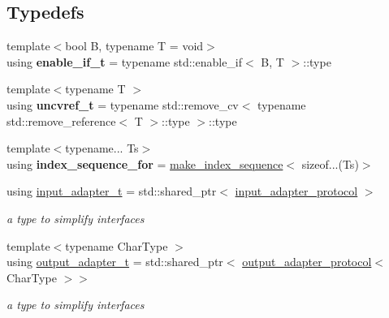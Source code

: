 \subsection*{Typedefs}
\begin{DoxyCompactItemize}
\item 
{\footnotesize template$<$bool B, typename T  = void$>$ }\\using {\bfseries enable\+\_\+if\+\_\+t} = typename std\+::enable\+\_\+if$<$ B, T $>$\+::type\hypertarget{namespacenlohmann_1_1detail_a02bcbc878bee413f25b985ada771aa9c}{}\label{namespacenlohmann_1_1detail_a02bcbc878bee413f25b985ada771aa9c}

\item 
{\footnotesize template$<$typename T $>$ }\\using {\bfseries uncvref\+\_\+t} = typename std\+::remove\+\_\+cv$<$ typename std\+::remove\+\_\+reference$<$ T $>$\+::type $>$\+::type\hypertarget{namespacenlohmann_1_1detail_a53a082eedad9f4729fcd8fed552a21f7}{}\label{namespacenlohmann_1_1detail_a53a082eedad9f4729fcd8fed552a21f7}

\item 
{\footnotesize template$<$typename... Ts$>$ }\\using {\bfseries index\+\_\+sequence\+\_\+for} = \hyperlink{structnlohmann_1_1detail_1_1make__index__sequence}{make\+\_\+index\+\_\+sequence}$<$ sizeof...(Ts)$>$\hypertarget{namespacenlohmann_1_1detail_a24800493c6ec02ce033dcbb47b7fd28e}{}\label{namespacenlohmann_1_1detail_a24800493c6ec02ce033dcbb47b7fd28e}

\item 
using \hyperlink{namespacenlohmann_1_1detail_ae132f8cd5bb24c5e9b40ad0eafedf1c2}{input\+\_\+adapter\+\_\+t} = std\+::shared\+\_\+ptr$<$ \hyperlink{structnlohmann_1_1detail_1_1input__adapter__protocol}{input\+\_\+adapter\+\_\+protocol} $>$\hypertarget{namespacenlohmann_1_1detail_ae132f8cd5bb24c5e9b40ad0eafedf1c2}{}\label{namespacenlohmann_1_1detail_ae132f8cd5bb24c5e9b40ad0eafedf1c2}

\begin{DoxyCompactList}\small\item\em a type to simplify interfaces \end{DoxyCompactList}\item 
{\footnotesize template$<$typename Char\+Type $>$ }\\using \hyperlink{namespacenlohmann_1_1detail_a0fd8edff7729aa2dd92b070964bade2e}{output\+\_\+adapter\+\_\+t} = std\+::shared\+\_\+ptr$<$ \hyperlink{structnlohmann_1_1detail_1_1output__adapter__protocol}{output\+\_\+adapter\+\_\+protocol}$<$ Char\+Type $>$$>$\hypertarget{namespacenlohmann_1_1detail_a0fd8edff7729aa2dd92b070964bade2e}{}\label{namespacenlohmann_1_1detail_a0fd8edff7729aa2dd92b070964bade2e}

\begin{DoxyCompactList}\small\item\em a type to simplify interfaces \end{DoxyCompactList}\end{DoxyCompactItemize}
